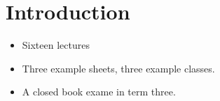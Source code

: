 
\chapter{Introduction}
\label{cha:introduction}

\begin{itemize}
\item Sixteen lectures
\item Three example sheets, three example classes.
\item A closed book exame in term three.
\end{itemize}
